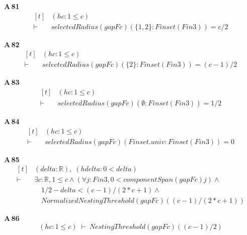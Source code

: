 \noindent\textbf{A\,81}\quad{}
{\footnotesize\[ \begin{aligned}[t]
&(\mathit{hc} : 1 \leq \mathit{c})\\
\vdash\;&\mathit{selectedRadius} (\mathit{gapF} \mathit{c}) (\{ 1,2\} : \mathit{Finset} (\mathit{Fin} 3)) = \mathit{c} / 2
\end{aligned} \]}

\noindent\textbf{A\,82}\quad{}
{\footnotesize\[ \begin{aligned}[t]
&(\mathit{hc} : 1 \leq \mathit{c})\\
\vdash\;&\mathit{selectedRadius} (\mathit{gapF} \mathit{c}) (\{ 2\} : \mathit{Finset} (\mathit{Fin} 3)) = (\mathit{c} - 1) / 2
\end{aligned} \]}

\noindent\textbf{A\,83}\quad{}
{\footnotesize\[ \begin{aligned}[t]
&(\mathit{hc} : 1 \leq \mathit{c})\\
\vdash\;&\mathit{selectedRadius} (\mathit{gapF} \mathit{c}) (\emptyset : \mathit{Finset} (\mathit{Fin} 3)) = 1 / 2
\end{aligned} \]}

\noindent\textbf{A\,84}\quad{}
{\footnotesize\[ \begin{aligned}[t]
&(\mathit{hc} : 1 \leq \mathit{c})\\
\vdash\;&\mathit{selectedRadius} (\mathit{gapF} \mathit{c}) (\mathit{Finset}.\mathit{univ} : \mathit{Finset} (\mathit{Fin} 3)) = 0
\end{aligned} \]}

\noindent\textbf{A\,85}\quad{}
{\footnotesize\[ \begin{aligned}[t]
&(\mathit{delta} : \mathbb{R} ),\; (\mathit{hdelta} : 0 < \mathit{delta})\\
\vdash\;&\exists \mathit{c} : \mathbb{R} , 1 \leq \mathit{c} \wedge (\forall \mathit{j} : \mathit{Fin} 3, 0 < \mathit{componentSpan} (\mathit{gapF} \mathit{c}) \mathit{j}) \wedge\\
&\quad 1 / 2 - \mathit{delta} < (\mathit{c} - 1) / (2 * \mathit{c} + 1) \wedge\\
&\quad \mathit{NormalizedNestingThreshold} (\mathit{gapF} \mathit{c}) ((\mathit{c} - 1) / (2 * \mathit{c} + 1))
\end{aligned} \]}

\noindent\textbf{A\,86}\quad{}
{\footnotesize\[ (\mathit{hc} : 1 \leq \mathit{c}) \;\vdash\; \mathit{NestingThreshold} (\mathit{gapF} \mathit{c}) ((\mathit{c} - 1) / 2) \]}

